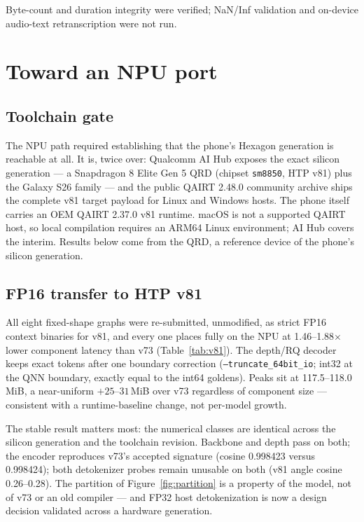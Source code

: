 \documentclass[10pt,twocolumn,letterpaper]{article}
\begin{document}
Byte-count and duration integrity were verified; NaN/Inf validation and
on-device audio-text retranscription were not run.

\section{Toward an NPU port}
\label{sec:npu}

\subsection{Toolchain gate}

The NPU path required establishing that the phone's Hexagon generation is
reachable at all. It is, twice over: Qualcomm AI Hub exposes the exact silicon
generation --- a Snapdragon 8 Elite Gen 5 QRD (chipset \texttt{sm8850}, HTP
v81) plus the Galaxy S26 family --- and the public QAIRT 2.48.0 community
archive ships the complete v81 target payload for Linux and Windows hosts.
The phone itself carries an OEM QAIRT 2.37.0 v81 runtime. macOS is not a
supported QAIRT host, so local compilation requires an ARM64 Linux
environment; AI Hub covers the interim. Results below come from the QRD, a
reference device of the phone's silicon generation.

\subsection{FP16 transfer to HTP v81}

All eight fixed-shape graphs were re-submitted, unmodified, as strict FP16
context binaries for v81, and every one places fully on the NPU at
1.46--1.88$\times$ lower component latency than v73
(Table~\ref{tab:v81}). The depth/RQ decoder keeps exact tokens after one
boundary correction (\texttt{--truncate\_64bit\_io}; int32 at the QNN
boundary, exactly equal to the int64 goldens). Peaks sit at
117.5--118.0\,MiB, a near-uniform $+25$--$31$\,MiB over v73 regardless of
component size --- consistent with a runtime-baseline change, not per-model
growth.

The stable result matters most: the numerical classes are identical across
the silicon generation and the toolchain revision. Backbone and depth pass on
both; the encoder reproduces v73's accepted signature (cosine 0.998423 versus
0.998424); both detokenizer probes remain unusable on both (v81 angle cosine
0.26--0.28). The partition of Figure~\ref{fig:partition} is a property of the
model, not of v73 or an old compiler --- and FP32 host detokenization is now a
design decision validated across a hardware generation.
\end{document}
